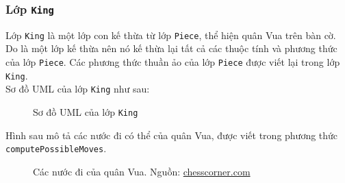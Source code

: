 \subsubsection{Lớp \lstinline{King}}
Lớp \lstinline{King} là một lớp con kế thừa từ lớp \lstinline{Piece}, thể hiện quân Vua trên bàn cờ. Do là một lớp kế thừa nên nó kế thừa lại tất cả các thuộc tính và phương thức của lớp \lstinline{Piece}. Các phương thức thuần ảo của lớp \lstinline{Piece} được viết lại trong lớp \lstinline{King}.\\
Sơ đồ UML của lớp \lstinline{King} như sau:
\begin{figure}[H]
\caption{Sơ đồ UML của lớp \lstinline{King}}
\end{figure}
Hình sau mô tả các nước đi có thể của quân Vua, được viết trong phương thức \lstinline{computePossibleMoves}.
\begin{figure}[H]
\caption{Các nước đi của quân Vua. Nguồn: \url{chesscorner.com}}
\end{figure}

